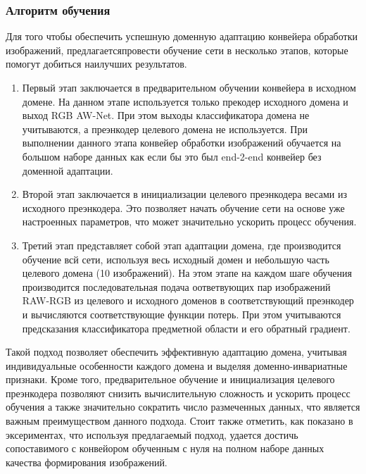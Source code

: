 \subsubsection{Алгоритм обучения}\label{sect-2-1-2}

Для того чтобы обеспечить успешную доменную адаптацию конвейера обработки изображений, предлагаетсяпровести обучение сети в несколько этапов, которые помогут добиться наилучших результатов.

\begin{enumerate}
    \item Первый этап заключается в предварительном обучении конвейера в исходном домене. На данном этапе используется только прекодер исходного домена и выход RGB AW-Net. При этом выходы классификатора домена не учитываются, а преэнкодер целевого домена не используется. При выполнении данного этапа конвейер обработки изображений обучается на большом наборе данных как если бы это был end-2-end конвейер без доменной адаптации.
    \item Второй этап заключается в инициализации целевого преэнкодера весами из исходного преэнкодера. Это позволяет начать обучение сети на основе уже настроенных параметров, что может значительно ускорить процесс обучения.
    \item Третий этап представляет собой этап адаптации домена, где производится обучение всй сети, используя весь исходный домен и небольшую часть целевого домена (10 изображений). На этом этапе на каждом шаге обучения производится последовательная подача оответвующих пар изображений RAW-RGB из целевого и исходного доменов в соответствующий преэнкодер и вычисляются соответствующие функции потерь. При этом учитываются предсказания классификатора предметной области и его обратный градиент.
\end{enumerate}

Такой подход позволяет обеспечить эффективную адаптацию домена, учитывая индивидуальные особенности каждого домена и выделяя доменно-инвариатные признаки. Кроме того, предварительное обучение и инициализация целевого преэнкодера позволяют снизить вычислительную сложность и ускорить процесс обучения а также значительно сократить число размеченных данных, что является важным преимуществом данного подхода. Стоит также отметить, как показано в эксериментах, что используя предлагаемый подход, удается достичь сопоставимого с конвейором обученным с нуля на полном наборе данных качества формирования изображений.

